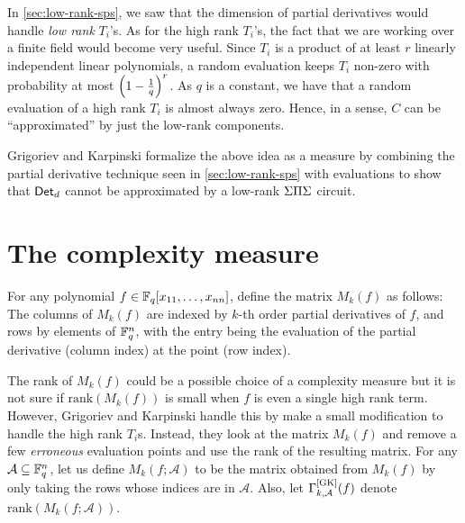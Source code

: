 In \autoref{sec:low-rank-sps}, we saw that the dimension of partial
derivatives would handle \emph{low rank} $T_i$'s. 
As for the high rank
$T_i$'s, the fact that we are working over a finite field would become
very useful. 
Since $T_i$ is a product of at least $r$ linearly
independent linear polynomials, a random evaluation keeps $T_i$
non-zero with probability at most $\left(1-\frac{1}{q}\right)^r$. 
As $q$
is a constant, we have that a random evaluation of a high rank $T_i$
is almost always zero. 
Hence, in a sense, $C$ can be ``approximated''
by just the low-rank components.

Grigoriev and Karpinski \cite{grigoriev98} formalize the above idea as
a measure by combining the partial derivative technique seen in
\autoref{sec:low-rank-sps} with evaluations to show that $\operatorname{\mathsf{Det}}_d$
cannot be approximated by a low-rank $\Sigma\Pi\Sigma$ circuit.

\section{The complexity measure}

For any polynomial $f \in \mathbb{F}_q[x_{11},\dots, x_{nn}]$, define the matrix
$M_k(f)$ as follows: The columns of $M_k(f)$ are indexed by $k$-th
order partial derivatives of $f$, and rows by elements of $\mathbb{F}_q^{n}$,
with the entry being the evaluation of the partial derivative (column
index) at the point (row index).\\



The rank of $M_k(f)$ could be a possible choice of a complexity
measure but it is not sure if $\mathrm{rank}(M_k(f))$ is small when
$f$ is even a single high rank term. 
However, Grigoriev and Karpinski
handle this by make a small modification to handle the high rank
$T_i$s. 
Instead, they look at the matrix $M_k(f)$ and remove a few
\emph{erroneous} evaluation points and use the rank of the resulting
matrix. 
For any $\mathcal{A}\subseteq \mathbb{F}_q^{n}$, let us define
$M_k(f;\mathcal{A})$ to be the matrix obtained from $M_k(f)$ by only
taking the rows whose indices are in $\mathcal{A}$. 
Also, let
$\Gamma^{\mathrm{[GK]}}_{k,\mathcal{A}}(f)$ denote
$\mathrm{rank}(M_k(f;\mathcal{A}))$.

